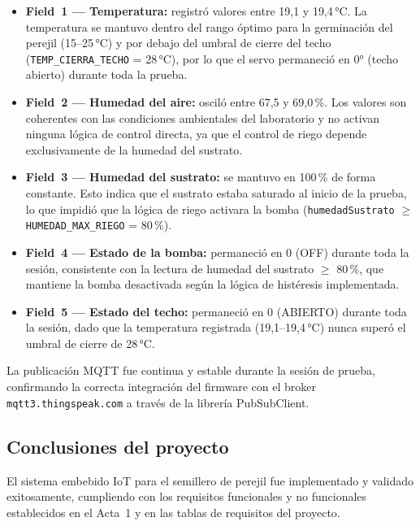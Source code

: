 \begin{itemize}
    \item \textbf{Field~1 — Temperatura:} registró valores entre 19,1 y 19,4\,°C. La temperatura se mantuvo dentro del rango óptimo para la germinación del perejil (15--25\,°C) y por debajo del umbral de cierre del techo (\texttt{TEMP\_CIERRA\_TECHO} = 28\,°C), por lo que el servo permaneció en 0° (techo abierto) durante toda la prueba.

    \item \textbf{Field~2 — Humedad del aire:} osciló entre 67,5 y 69,0\,\%. Los valores son coherentes con las condiciones ambientales del laboratorio y no activan ninguna lógica de control directa, ya que el control de riego depende exclusivamente de la humedad del sustrato.

    \item \textbf{Field~3 — Humedad del sustrato:} se mantuvo en 100\,\% de forma constante. Esto indica que el sustrato estaba saturado al inicio de la prueba, lo que impidió que la lógica de riego activara la bomba (\texttt{humedadSustrato} $\geq$ \texttt{HUMEDAD\_MAX\_RIEGO} = 80\,\%).

    \item \textbf{Field~4 — Estado de la bomba:} permaneció en 0 (OFF) durante toda la sesión, consistente con la lectura de humedad del sustrato $\geq$ 80\,\%, que mantiene la bomba desactivada según la lógica de histéresis implementada.

    \item \textbf{Field~5 — Estado del techo:} permaneció en 0 (ABIERTO) durante toda la sesión, dado que la temperatura registrada (19,1--19,4\,°C) nunca superó el umbral de cierre de 28\,°C.
\end{itemize}

La publicación MQTT fue continua y estable durante la sesión de prueba, confirmando la correcta integración del firmware con el broker \texttt{mqtt3.thingspeak.com} a través de la librería PubSubClient.

\subsection{Conclusiones del proyecto}

El sistema embebido IoT para el semillero de perejil fue implementado y validado exitosamente, cumpliendo con los requisitos funcionales y no funcionales establecidos en el Acta~1 y en las tablas de requisitos del proyecto.


